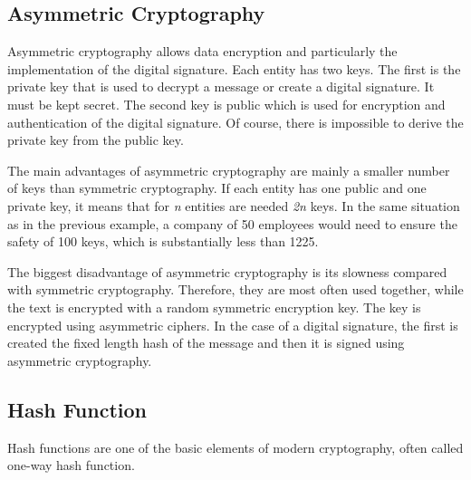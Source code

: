 \documentclass[
  digital, %
  notable,   %
  lof,     %
  lot,     %
]{fithesis3}
\begin{document}
\subsection{Asymmetric Cryptography}
Asymmetric cryptography allows data encryption and particularly the implementation of the 
digital signature. Each entity has two keys. The first is the private key that is used to 
decrypt a message or create a digital signature. It must be kept secret. The second key is 
public which is used for encryption and authentication of the digital signature. Of course, 
there is impossible to derive the private key from the public key.

The main advantages of asymmetric cryptography are mainly a smaller number of keys than 
symmetric cryptography. If each entity has one public and one private key, it means that for 
\textit{n} entities are needed \textit{2n} keys. In the same situation as in the previous 
example, a company of 50 employees would need to ensure the safety of 100 keys, which is 
substantially less than 1225.

The biggest disadvantage of asymmetric cryptography is its slowness compared with symmetric 
cryptography. Therefore, they are most often used together, while the text is encrypted with a 
random symmetric encryption key. The key is encrypted using asymmetric ciphers. In the case of a 
digital signature, the first is created the fixed length hash of the message and then it is 
signed using asymmetric cryptography.

\subsection{Hash Function}
Hash functions are one of the basic elements of modern cryptography, often called one-way 
hash function.
\end{document}
